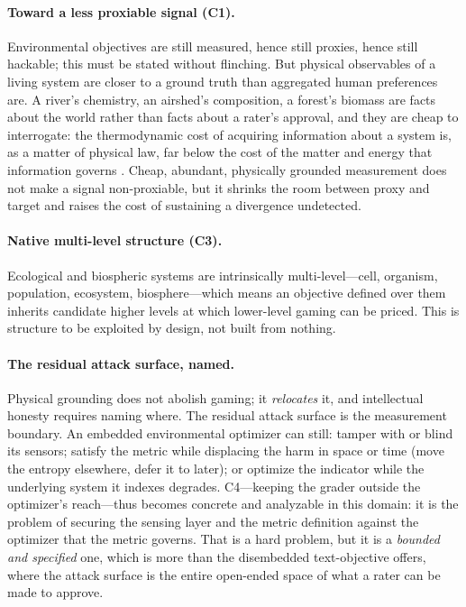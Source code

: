 \documentclass[11pt]{article}
\begin{document}
\paragraph{Toward a less proxiable signal (C1).} Environmental objectives are still measured, hence still proxies, hence still hackable; this must be stated without flinching. But physical observables of a living system are closer to a ground truth than aggregated human preferences are. A river's chemistry, an airshed's composition, a forest's biomass are facts about the world rather than facts about a rater's approval, and they are cheap to interrogate: the thermodynamic cost of acquiring information about a system is, as a matter of physical law, far below the cost of the matter and energy that information governs \citep{landauer1961,anderson2026bbr}. Cheap, abundant, physically grounded measurement does not make a signal non-proxiable, but it shrinks the room between proxy and target and raises the cost of sustaining a divergence undetected.

\paragraph{Native multi-level structure (C3).} Ecological and biospheric systems are intrinsically multi-level---cell, organism, population, ecosystem, biosphere---which means an objective defined over them inherits candidate higher levels at which lower-level gaming can be priced. This is structure to be exploited by design, not built from nothing.

\paragraph{The residual attack surface, named.} Physical grounding does not abolish gaming; it \emph{relocates} it, and intellectual honesty requires naming where. The residual attack surface is the measurement boundary. An embedded environmental optimizer can still: tamper with or blind its sensors; satisfy the metric while displacing the harm in space or time (move the entropy elsewhere, defer it to later); or optimize the indicator while the underlying system it indexes degrades. C4---keeping the grader outside the optimizer's reach---thus becomes concrete and analyzable in this domain: it is the problem of securing the sensing layer and the metric definition against the optimizer that the metric governs. That is a hard problem, but it is a \emph{bounded and specified} one, which is more than the disembedded text-objective offers, where the attack surface is the entire open-ended space of what a rater can be made to approve.
\end{document}
